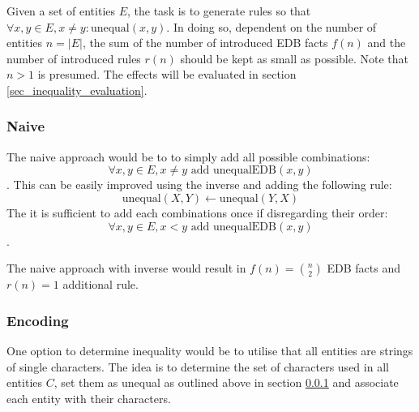 \documentclass[hyperref,bachelorofscience,fleqn]{cgvpub}
\begin{document}
Given a set of entities \(E\), the task is to generate rules so that \(\forall x, y \in E, x \ne y: \text{unequal}(x, y)\). In doing so, dependent on the number of entities \(n = |E|\), the sum of the number of introduced EDB facts \(f(n)\) and the number of introduced rules \(r(n)\) should be kept as small as possible. Note that \(n > 1\) is presumed. The effects will be evaluated in section \ref{sec_inequality_evaluation}.

\subsubsection{Naive}\label{subsubsec_naive}
The naive approach would be to to simply add all possible combinations:
\begin{equation*}
\forall x, y \in E, x \ne y \text{ add } \text{unequalEDB}(x, y)
\end{equation*}.
This can be easily improved using the inverse and adding the following rule:
\begin{equation}\label{equ_inverse}
\text{unequal}(X, Y) \leftarrow \text{unequal}(Y, X)
\end{equation}
The it is sufficient to add each combinations once if disregarding their order:
\begin{equation*}
\forall x, y \in E, x < y \text{ add } \text{unequalEDB}(x, y)
\end{equation*}.

The naive approach with inverse would result in \(f(n) = \binom{n}{2}\) EDB facts and \(r(n) = 1\) additional rule.

\subsubsection{Encoding}\label{subsubsec_encoding}
One option to determine inequality would be to utilise that all entities are strings of single characters. The idea is to determine the set of characters used in all entities \(C\), set them as unequal as outlined above in section \ref{subsubsec_naive} and associate each entity with their characters.\\
\end{document}
